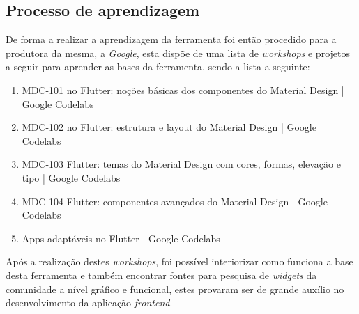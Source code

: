 \subsection{Processo de aprendizagem}
De forma a realizar a aprendizagem da ferramenta foi então procedido para a produtora da mesma, a \textit{Google}, esta dispõe de uma lista de \textit{workshops} e projetos a seguir para aprender as bases da ferramenta, sendo a lista a seguinte:

\begin{enumerate}
 \item MDC-101 no Flutter: noções básicas dos componentes do Material Design | Google Codelabs
 \item MDC-102 no Flutter: estrutura e layout do Material Design | Google Codelabs
 \item MDC-103 Flutter: temas do Material Design com cores, formas, elevação e tipo | Google Codelabs
 \item MDC-104 Flutter: componentes avançados do Material Design | Google Codelabs
 \item Apps adaptáveis no Flutter | Google Codelabs
\end{enumerate}

Após a realização destes \textit{workshops}, foi possível interiorizar como funciona a base desta ferramenta e também encontrar fontes para pesquisa de \textit{widgets} da comunidade a nível gráfico e funcional, estes provaram ser de grande auxílio no desenvolvimento da aplicação \textit{frontend}.